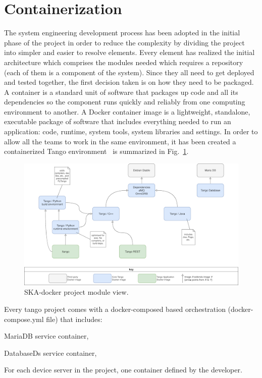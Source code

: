 \documentclass[a4paper,
               keeplastbox,   %
               ]{jacow}
\begin{document}
\section{Containerization}
The system engineering development process has been adopted in the initial phase of the project in order to reduce the complexity by dividing the project into simpler and easier to resolve elements. Every element has realized the initial architecture which comprises the modules needed which requires a repository (each of them is a component of the system).
Since they all need to get deployed and tested together, the first decision taken is on how they need to be packaged.  A container is a standard unit of software that packages up code and all its dependencies so the component runs quickly and reliably from one computing environment to another. A Docker container image is a lightweight, standalone, executable package of software that includes everything needed to run an application: code, runtime, system tools, system libraries and settings.
In order to allow all the teams to work in the same environment, it has been created a containerized Tango environment~\cite{SKA-docker} is summarized in Fig.~\ref{fig:skadocker}. 
\begin{figure}[!htb]
   \centering
   \includegraphics*[width=1\columnwidth]{ska-docker}
   \caption{SKA-docker project module view.}
   \label{fig:skadocker}
\end{figure}
Every tango project comes with a docker-composed based orchestration (docker-compose.yml file) that includes:
\begin{Itemize}
    \item MariaDB service container, 
    \item DatabaseDs service container,
    \item For each device server in the project, one container defined by the developer.
\end{Itemize}
\end{document}
